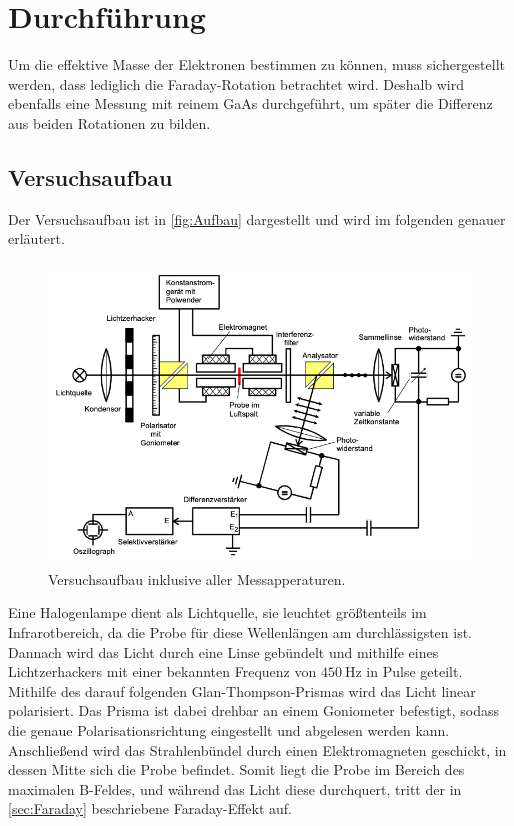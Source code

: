 \section{Durchführung}
\label{sec:Durchführung}

Um die effektive Masse der Elektronen bestimmen zu können, muss sichergestellt werden,
dass lediglich die Faraday-Rotation betrachtet wird. Deshalb wird ebenfalls eine Messung
mit reinem GaAs durchgeführt, um später die Differenz aus beiden Rotationen zu bilden.

\subsection{Versuchsaufbau}

Der Versuchsaufbau ist in \autoref{fig:Aufbau} dargestellt und wird im folgenden genauer erläutert.

\begin{figure} [H]
    \centering
    \includegraphics[height=8cm]{content/Aufbau.png}
    \caption{Versuchsaufbau inklusive aller Messapperaturen. \cite{V46}}
    \label{fig:Aufbau}
\end{figure}

Eine Halogenlampe dient als Lichtquelle, sie leuchtet größtenteils im Infrarotbereich, da die Probe für diese Wellenlängen
am durchlässigsten ist. Dannach wird das Licht durch eine Linse gebündelt und mithilfe eines Lichtzerhackers mit einer bekannten
Frequenz von $\qty{450}{\Hz}$ in Pulse geteilt. Mithilfe des darauf folgenden Glan-Thompson-Prismas wird das Licht linear polarisiert.
Das Prisma ist dabei drehbar an einem Goniometer befestigt, sodass die genaue Polarisationsrichtung eingestellt und abgelesen werden kann.
Anschließend wird das Strahlenbündel durch einen Elektromagneten geschickt, in dessen Mitte sich die Probe befindet.
Somit liegt die Probe im Bereich des maximalen B-Feldes, und während das Licht diese durchquert, tritt der in \autoref{sec:Faraday}
beschriebene Faraday-Effekt auf.

